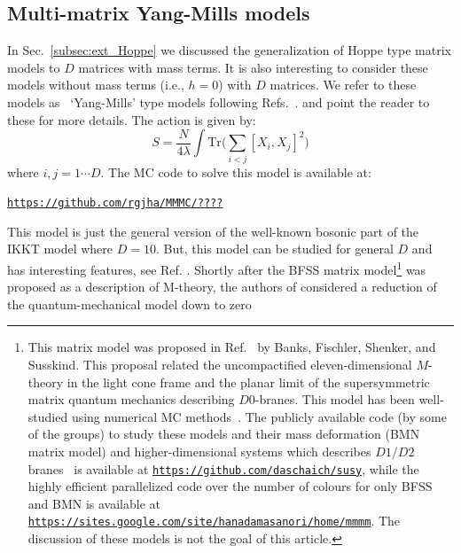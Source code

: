 \documentclass[letter,11pt]{article}
\begin{document}
\subsection{Multi-matrix Yang-Mills models}
In Sec.~\ref{subsec:ext_Hoppe} we discussed the generalization of Hoppe type matrix models to $D$ matrices
with mass terms. It is also interesting to consider these models without mass terms (i.e., $h=0$) with $D$ matrices. 
We refer to these models as ~`Yang-Mills' type models following Refs.~\cite{Krauth:1998yu,Krauth:1999qw}. 
and point the reader to these for more details. The action is given by: 
\begin{equation}
	\label{eq:CTmodel} 
S = \frac{N}{4\lambda} \int \mbox{Tr} \Bigg( \sum_{i < j}[X_i, X_j]^{2}\Bigg) 
\end{equation}
where $i, j = 1 \cdots D$. The MC code to solve this model is available at:
\begin{center} \texttt{\href{https://github.com/rgjha/MMMC/____}{https://github.com/rgjha/MMMC/????}} \end{center}
This model is just the general version of the well-known bosonic part of the IKKT model
where $D=10$. But, this model can be studied for general $D$ and has interesting features, see Ref. \cite{Hotta:1998en}. 
Shortly after the BFSS matrix model\footnote{This matrix model was proposed in Ref.~\cite{Banks:1996vh} by
Banks, Fischler, Shenker, and Susskind. This proposal related the 
uncompactified eleven-dimensional $M$-theory in the light cone frame and the 
planar limit of the supersymmetric matrix quantum mechanics describing $D0$-branes. This model has been
well-studied using numerical MC methods~\cite{Catterall:2007fp,Hanada:2008ez,Filev:2015hia,Berkowitz:2016tyy}. 
The publicly available code (by some of the groups) to study these models and their mass deformation (BMN matrix model) and higher-dimensional systems which describes $D1/D2$ branes~\cite{Catterall:2017lub,Jha:2017zad,Catterall:2020nmn}
is available at \texttt{\href{https://github.com/daschaich/susy}{https://github.com/daschaich/susy}}, while the
highly efficient parallelized code over the number of colours for only BFSS and BMN is available at
\texttt{\href{https://sites.google.com/site/hanadamasanori/home/mmmm}
{https://sites.google.com/site/hanadamasanori/home/mmmm}}.
The discussion of these models is not the goal of this article. 
}
was proposed as a description of M-theory, the authors of 
\cite{Ishibashi:1996xs} considered a reduction of the quantum-mechanical model down to zero 
\end{document}
